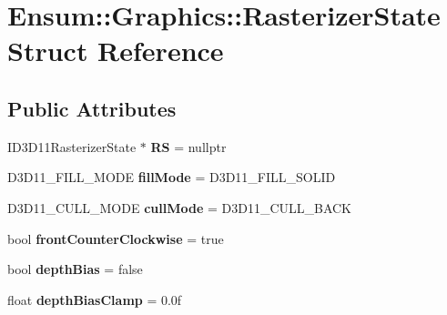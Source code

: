\hypertarget{struct_ensum_1_1_graphics_1_1_rasterizer_state}{}\section{Ensum\+:\+:Graphics\+:\+:Rasterizer\+State Struct Reference}
\label{struct_ensum_1_1_graphics_1_1_rasterizer_state}
\subsection*{Public Attributes}
\begin{DoxyCompactItemize}
\item 
I\+D3\+D11\+Rasterizer\+State $\ast$ {\bfseries RS} = nullptr\hypertarget{struct_ensum_1_1_graphics_1_1_rasterizer_state_ae3ef20a74ab9418142c0e4002c1b5c90}{}\label{struct_ensum_1_1_graphics_1_1_rasterizer_state_ae3ef20a74ab9418142c0e4002c1b5c90}

\item 
D3\+D11\+\_\+\+F\+I\+L\+L\+\_\+\+M\+O\+DE {\bfseries fill\+Mode} = D3\+D11\+\_\+\+F\+I\+L\+L\+\_\+\+S\+O\+L\+ID\hypertarget{struct_ensum_1_1_graphics_1_1_rasterizer_state_a265bb98074a662ab864eb5b2ff44e96b}{}\label{struct_ensum_1_1_graphics_1_1_rasterizer_state_a265bb98074a662ab864eb5b2ff44e96b}

\item 
D3\+D11\+\_\+\+C\+U\+L\+L\+\_\+\+M\+O\+DE {\bfseries cull\+Mode} = D3\+D11\+\_\+\+C\+U\+L\+L\+\_\+\+B\+A\+CK\hypertarget{struct_ensum_1_1_graphics_1_1_rasterizer_state_aca0a2f0d9dfad54792f66b3718a4d77d}{}\label{struct_ensum_1_1_graphics_1_1_rasterizer_state_aca0a2f0d9dfad54792f66b3718a4d77d}

\item 
bool {\bfseries front\+Counter\+Clockwise} = true\hypertarget{struct_ensum_1_1_graphics_1_1_rasterizer_state_a0ff4a89ecdf6bbfd726a8b35688f84b0}{}\label{struct_ensum_1_1_graphics_1_1_rasterizer_state_a0ff4a89ecdf6bbfd726a8b35688f84b0}

\item 
bool {\bfseries depth\+Bias} = false\hypertarget{struct_ensum_1_1_graphics_1_1_rasterizer_state_aba59a9d776f4dbe6bb121bc41e49392b}{}\label{struct_ensum_1_1_graphics_1_1_rasterizer_state_aba59a9d776f4dbe6bb121bc41e49392b}

\item 
float {\bfseries depth\+Bias\+Clamp} = 0.\+0f\hypertarget{struct_ensum_1_1_graphics_1_1_rasterizer_state_a10d339c084553ca221a82e7bbff677ad}{}\label{struct_ensum_1_1_graphics_1_1_rasterizer_state_a10d339c084553ca221a82e7bbff677ad}


\end{DoxyCompactItemize}
